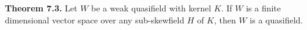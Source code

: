 \textbf{Theorem 7.3.} Let $W$ be a weak quasifield with kernel $K$. If $W$ is a finite dimensional vector space over any sub-skewfield $H$ of $K$, then $W$ is a quasifield.
